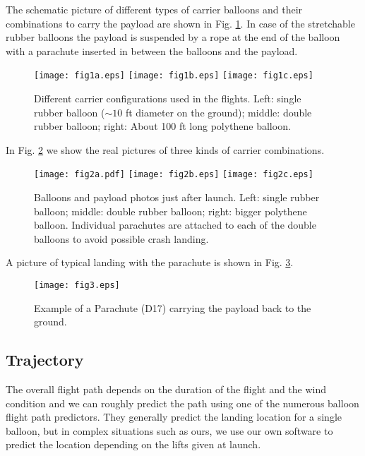 The schematic picture of different types of carrier balloons and their
combinations to carry the payload are shown in Fig. \ref{fig:flttyp}.
In case of the stretchable rubber balloons the payload is suspended by a rope 
at the end of the balloon with a parachute inserted in between the balloons
and the payload.  

\begin{figure}[h]
  \centering
  \texttt{[image: fig1a.eps]}
  \texttt{[image: fig1b.eps]}
  \texttt{[image: fig1c.eps]}
  \caption{Different carrier configurations used in the flights. Left: single 
  rubber balloon ($\sim 10$ ft diameter on the ground); 
middle: double rubber balloon; right: About 100 ft long polythene balloon.}
   \label{fig:flttyp}
\end{figure}

In Fig. \ref{fig:balpic} we show the real pictures of three kinds of carrier 
combinations.
\begin{figure}[h]
  \centering
  \texttt{[image: fig2a.pdf]}
  \texttt{[image: fig2b.eps]}
  \texttt{[image: fig2c.eps]}
\caption{Balloons and payload photos just after launch. Left: single 
rubber balloon; middle: double rubber balloon; right: bigger polythene
balloon. Individual parachutes are attached to  each of the double balloons
to avoid possible crash landing.}
   \label{fig:balpic}
\end{figure}
A picture of typical landing with the parachute is shown in Fig. \ref{fig:para}.
\begin{figure}[h]
  \centering
  \texttt{[image: fig3.eps]}
  \caption{Example of a Parachute (D17) carrying the payload back to the ground.}
   \label{fig:para}
\end{figure}

\subsection{Trajectory}
\label{ssec:traj}
The overall flight path depends on the duration of the flight and the wind
condition and we can roughly predict the path using one of the numerous balloon 
flight path predictors. They generally predict the landing location for a single
balloon, but in complex situations such as ours, we use our own software
to predict the location depending on the lifts given at launch.

